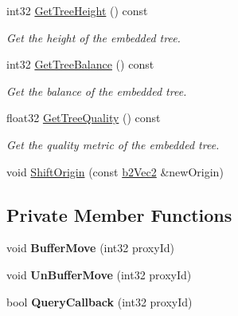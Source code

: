 \begin{DoxyCompactItemize}
\item 
\mbox{\label{classb2BroadPhase_a868f95225d62c3ea79d231ed305253ea}} 
int32 \mbox{\hyperlink{classb2BroadPhase_a868f95225d62c3ea79d231ed305253ea}{Get\+Tree\+Height}} () const
\begin{DoxyCompactList}\small\item\em Get the height of the embedded tree. \end{DoxyCompactList}\item 
\mbox{\label{classb2BroadPhase_a29612faf9f0191827440178629d5e887}} 
int32 \mbox{\hyperlink{classb2BroadPhase_a29612faf9f0191827440178629d5e887}{Get\+Tree\+Balance}} () const
\begin{DoxyCompactList}\small\item\em Get the balance of the embedded tree. \end{DoxyCompactList}\item 
\mbox{\label{classb2BroadPhase_a4e7d2f5d16ac100b18511e6a42e758bf}} 
float32 \mbox{\hyperlink{classb2BroadPhase_a4e7d2f5d16ac100b18511e6a42e758bf}{Get\+Tree\+Quality}} () const
\begin{DoxyCompactList}\small\item\em Get the quality metric of the embedded tree. \end{DoxyCompactList}\item 
void \mbox{\hyperlink{classb2BroadPhase_a410e6115e3d1b4fca61cfbf397767772}{Shift\+Origin}} (const \mbox{\hyperlink{structb2Vec2}{b2\+Vec2}} \&new\+Origin)
\end{DoxyCompactItemize}
\subsection*{Private Member Functions}
\begin{DoxyCompactItemize}
\item 
\mbox{\label{classb2BroadPhase_a4917a3c91402339757b5edc1a07ac1f9}} 
void {\bfseries Buffer\+Move} (int32 proxy\+Id)
\item 
\mbox{\label{classb2BroadPhase_a5744c0e7a5cbc0bceb0fca334827ca35}} 
void {\bfseries Un\+Buffer\+Move} (int32 proxy\+Id)
\item 
\mbox{\label{classb2BroadPhase_a7c24ab9e23c062ea51d8018aee0d03f5}} 
bool {\bfseries Query\+Callback} (int32 proxy\+Id)
\end{DoxyCompactItemize}
